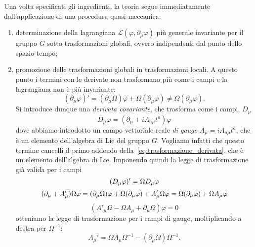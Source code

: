 \documentclass[italian,a4paper]{article}
\theoremstyle{definition}
\newcommand{\lagr}{\ensuremath{\mathscr{L}}}
\newcommand{\dimu}{\ensuremath{\partial_{\mu}}}
\newcommand{\Dimu}{\ensuremath{D_{\mu}}}
\begin{document}
Una volta specificati gli ingredienti, la teoria segue immediatamente
dall'applicazione di una procedura quasi meccanica:
\begin{enumerate}
    \item determinazione della lagrangiana $\lagr(\varphi,
        \dimu\varphi)$ pi\`u generale invariante per il gruppo $G$ sotto
        trasformazioni globali, ovvero indipendenti dal punto dello
        spazio-tempo;
    \item promozione delle trasformazioni globali in trasformazioni locali.
        A questo punto i termini con le derivate non trasformano pi\`u come
        i campi e la lagrangiana non \`e pi\`u invariante:
        \begin{equation}
            (\dimu\varphi)' = (\dimu \Omega)\varphi +
            \Omega(\dimu\varphi)\neq \Omega(\dimu \varphi).
            \label{eq:trasformazione_derivata}
        \end{equation}
        Si introduce dunque una \emph{derivata covariante}, che trasforma
        come i campi, $\Dimu$
        \begin{equation*}
            \Dimu \varphi = (\dimu + i A_{a\mu}t^{a})\varphi
        \end{equation*}
        dove abbiamo introdotto un campo vettoriale reale \emph{di gauge} $A_\mu = i A_{a\mu}t^{a}$,
        che \`e un elemento dell'algebra di Lie del gruppo $G$. Vogliamo
        infatti che questo termine cancelli il primo addendo
        della~\eqref{eq:trasformazione_derivata}, che \`e un elemento
        dell'algebra di Lie.
        Imponendo quindi la legge di trasformazione gi\`a valida per i campi
        \begin{equation*}
            (\Dimu \varphi)' = \Omega \Dimu \varphi\\
        \end{equation*}
        \begin{equation*}
            (\dimu + A'_{\mu})\Omega \varphi = (\dimu \Omega)\varphi +
            \Omega (\dimu \varphi) + A'_\mu\Omega\varphi = \Omega(\dimu
            \varphi) + \Omega A_\mu \varphi\\
        \end{equation*}
        \begin{equation*}
            (A'_\mu\Omega - \Omega A_\mu + \dimu \Omega)\varphi = 0
        \end{equation*}
        otteniamo la legge di trasformazione per i campi di gauge,
        moltiplicando a destra per $\Omega^{-1}$:
        \begin{equation}
            A_{\mu}' = \Omega A_\mu \Omega^{-1} - (\dimu \Omega)
            \Omega^{-1}.
            \label{eq:trasformazione_campi_gauge}
        \end{equation}


\end{enumerate}
\end{document}
